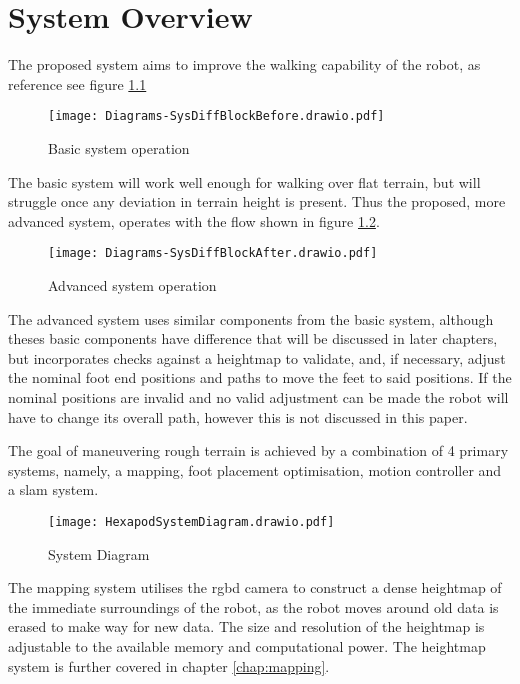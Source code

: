 \chapter{System Overview}
The proposed system aims to improve the walking capability of the robot, as reference see figure \ref{fig:basic_sys}
\begin{figure}[h]
    \centering
    \texttt{[image: Diagrams-SysDiffBlockBefore.drawio.pdf]}
    \caption{Basic system operation}
    \label{fig:basic_sys}
\end{figure}

\noindent
The basic system will work well enough for walking over flat terrain, but will struggle once any
deviation in terrain height is present. Thus the proposed, more advanced system, operates with the flow shown in figure \ref{fig:adv_sys}.
\begin{figure}[h]
    \centering
    \texttt{[image: Diagrams-SysDiffBlockAfter.drawio.pdf]}
    \caption{Advanced system operation}
    \label{fig:adv_sys}
\end{figure}

\noindent
The advanced system uses similar components from the basic system, although theses basic components have difference that will be discussed in
later chapters, but incorporates checks against a heightmap to validate, and, if necessary, adjust the nominal foot end positions and paths to
move the feet to said positions. If the nominal positions are invalid and no valid adjustment can be made the robot will have to change
its overall path, however this is not discussed in this paper.

The goal of maneuvering rough terrain is achieved by a combination of 4 primary systems, namely, a mapping, 
foot placement optimisation, motion controller and a \ac*{slam} system.
\begin{figure}[h]
    \centering
    \texttt{[image: HexapodSystemDiagram.drawio.pdf]}
    \caption{System Diagram}
    \label{fig:system_diagram}
\end{figure}

The mapping system utilises the \ac*{rgbd} camera to construct a dense heightmap of the immediate surroundings of the robot, as the robot moves around old data is erased to make
way for new data. The size and resolution of the heightmap is adjustable to the available memory and computational power. The heightmap system is further covered in chapter \ref{chap:mapping}.

